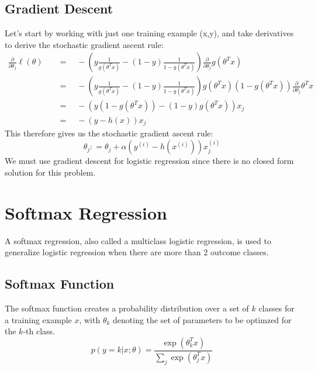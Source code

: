\documentclass[twoside,twocolumn]{article}
\begin{document}
\subsection{Gradient Descent}
Let’s start by working with just one training example (x,y), and take
derivatives to derive the stochastic gradient ascent rule:
\begin{equation}
  \begin{aligned}
    \frac { \partial } { \partial \theta _ { j } } \ell ( \theta ) \quad & = \quad - \left( y \frac { 1 } { g \left( \theta ^ { T } x \right) } - ( 1 - y ) \frac { 1 } { 1 - g \left( \theta ^ { T } x \right) } \right) \frac { \partial } { \partial \theta _ { j } } g \left( \theta ^ { T } x \right) \\
    & = \quad - \left( y \frac { 1 } { g \left( \theta ^ { T } x \right) } - ( 1 - y ) \frac { 1 } { 1 - g \left( \theta ^ { T } x \right) } \right) g \left( \theta ^ { T } x \right) \left( 1 - g \left( \theta ^ { T } x \right) \right) \frac { \partial } { \partial \theta _ { j } } \theta ^ { T } x \\
    & = \quad - \left( y \left( 1 - g \left( \theta ^ { T } x \right) \right) - ( 1 - y ) g \left( \theta ^ { T } x \right) \right) x _ { j } \\
    & = \quad - \left( y - h ( x ) \right) x _ { j }
  \end{aligned}
\end{equation}
This therefore gives us the stochastic gradient ascent rule:
\begin{equation}
  \theta _ { j } : = \theta _ { j } + \alpha \left( y ^ { ( i ) } - h \left( x ^ { ( i ) } \right) \right) x _ { j } ^ { ( i ) }
\end{equation}
We must use gradient descent for logistic regression since there is no closed
form solution for this problem.
\section{Softmax Regression}
A softmax regression, also called a multiclass logistic regression, is
used to generalize logistic regression when there are more than 2 outcome
classes.
\subsection{Softmax Function}
The softmax function creates a probability distribution over a set of $k$
classes for a training example $x$, with $\theta_k$ denoting the set of
parameters to be optimzed for the $k$-th class.
\begin{equation}
  p(y=k | x; \theta) = \frac{\exp \left(\theta_k^T x \right)}{\sum_j \exp \left( \theta_j^T x \right)}
\end{equation}
\end{document}
